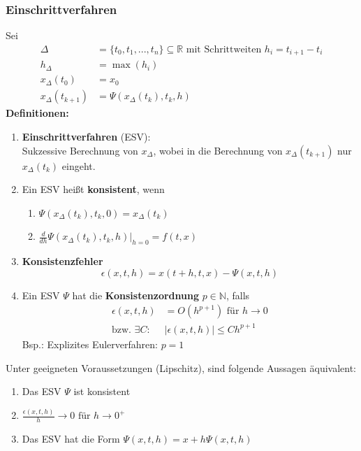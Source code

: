 \documentclass[a4paper,twocolumn,10pt]{article}
\begin{document}
\subsubsection{Einschrittverfahren}
Sei
\begin{equation*}
\begin{split}
\Delta &=\{t_0,t_1,...,t_n\}\subseteq\mathbb{R}\text{ mit Schrittweiten }h_i=t_{i+1}-t_i\\
h_{\Delta}&=\max(h_i)\\
x_{\Delta}(t_0)&=x_0\\
x_{\Delta}(t_{k+1})&=\Psi(x_{\Delta}(t_k),t_k,h)
\end{split}
\end{equation*}
\textbf{Definitionen:}
\begin{enumerate}[label=$\bullet$]
\item \textbf{Einschrittverfahren} (ESV):\\
Sukzessive Berechnung von $x_{\Delta}$, wobei in die Berechnung von $x_{\Delta}(t_{k+1})$ nur $x_{\Delta}(t_k)$ eingeht.
\item Ein ESV heißt \textbf{konsistent}, wenn
\begin{enumerate}
\item $\Psi(x_{\Delta}(t_k),t_k,0)=x_{\Delta}(t_k)$
\item $\frac{d}{dh}\Psi(x_{\Delta}(t_k),t_k,h)|_{h=0}=f(t,x)$
\end{enumerate}
\item \textbf{Konsistenzfehler}
\begin{equation*}
\epsilon(x,t,h)=x(t+h,t,x)-\Psi(x,t,h)
\end{equation*}
\item Ein ESV $\Psi$ hat die \textbf{Konsistenzordnung} $p\in\mathbb{N}$, falls
\begin{equation*}
\begin{split}
\epsilon(x,t,h)&=O(h^{p+1})\text{ für }h\rightarrow 0\\
\text{bzw. }\exists C:\;\;&|\epsilon(x,t,h)|\leq Ch^{p+1}
\end{split}
\end{equation*}
Bsp.: Explizites Eulerverfahren: $p=1$
\end{enumerate}
Unter geeigneten Voraussetzungen (Lipschitz), sind folgende Aussagen äquivalent:
\begin{enumerate}[label=$\bullet$]
\item Das ESV $\Psi$ ist konsistent
\item $\frac{\epsilon(x,t,h)}{h}\rightarrow 0\text{ für }h\rightarrow 0^+$
\item Das ESV hat die Form $\Psi(x,t,h)=x+h\Psi(x,t,h)$
\end{enumerate}
\end{document}
